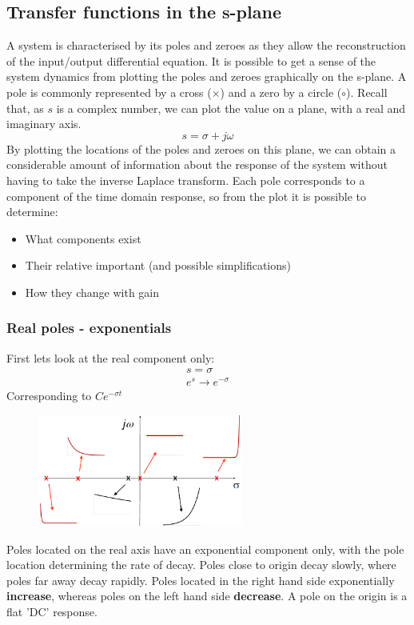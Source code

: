 \documentclass[class=report, crop=false, 12pt,a4paper]{standalone}
\begin{document}
\subsection{Transfer functions in the s-plane}
A system is characterised by its poles and zeroes as they allow the reconstruction of the input/output differential equation. It is possible to get a sense of the system dynamics from plotting the poles and zeroes graphically on the s-plane. A pole is commonly represented by a cross ($\times$) and a zero by a circle ($\circ$). Recall that, as $s$ is a complex number, we can plot the value on a plane, with a real and imaginary axis. 
\begin{equation}
  s = \sigma + j\omega
\end{equation}
By plotting the locations of the poles and zeroes on this plane, we can obtain a considerable amount of information about the response of the system without having to take the inverse Laplace transform. Each pole corresponds to a component of the time domain response, so from the plot it is possible to determine:
\begin{itemize}
  \item What components exist
  \item Their relative important (and possible simplifications)
  \item How they change with gain
\end{itemize}
\subsubsection{Real poles - exponentials}
First lets look at the real component only:
\begin{gather}
  s = \sigma\\
  e^s \rightarrow e^{-\sigma}
\end{gather}
Corresponding to $Ce^{-\sigma t}$
\begin{figure}[H]
  \centering
  \includegraphics[width = 0.6\textwidth]{../img/diagram90.png}
\end{figure}
Poles located on the real axis have an exponential component only, with the pole location determining the rate of decay. Poles close to origin decay slowly, where poles far away decay rapidly. Poles located in the right hand side exponentially \textbf{increase}, whereas poles on the left hand side \textbf{decrease}. A pole on the origin is a flat 'DC' response.
\end{document}
